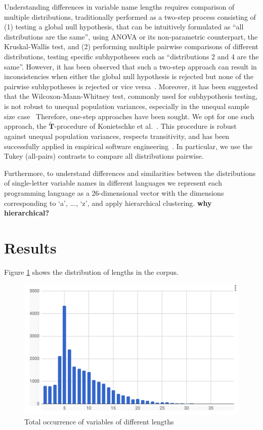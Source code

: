 \documentclass[conference]{IEEEtran}
\newcommand{\todo}[1]{ \textbf{#1} }
\begin{document}
Understanding differences in variable name lengths requires comparison of multiple distributions, traditionally performed as a two-step process consisting of (1) testing a global null hypothesis, that can be intuitively formulated as ``all distributions are the same'', using ANOVA or its non-parametric counterpart, the Kruskal-Wallis test, and (2) performing multiple pairwise comparisons of different distributions, testing specific subhypotheses such as ``distributions 2 and 4 are the same''. 
However, it has been observed that such a two-step approach can result in inconsistencies when either the global null hypothesis is rejected but none of the pairwise subhypotheses is rejected or vice versa~\cite{Gabriel}. 
Moreover, it has been suggested that the Wilcoxon-Mann-Whitney test, commonly used for subhypothesis testing, is not robust to unequal population variances, especially in the unequal sample size case~\cite{Zimmerman:Zumbo}
Therefore, one-step approaches have been sought.
We opt for one such approach, the $\widetilde{\mathbf{T}}$-procedure of Konietschke et al.~\cite{Konietschke:Hothorn:Brunner}. 
This procedure is robust against unequal population variances, respects transitivity, and has been successfully applied in empirical software engineering~\cite{VasilescuSGM14,VasilescuCS14,YuWYW16}.
In particular, we use the Tukey (all-pairs) contrasts to compare all distributions pairwise.

Furthermore, to understand differences and similarities between the distributions of single-letter variable names in different languages we represent each programming language as a 26-dimensional vector with the dimensions corresponding to `a', ..., `z', and apply hierarchical clustering. \todo{why hierarchical?}
 \section{Results}

Figure \ref{fig:distribution_of_lengths} shows the distribution of lengths in the corpus.

\begin{figure}[h]
	\begin{center}
		\includegraphics[width=\columnwidth]{fig/distribution_of_lengths}
		\caption{Total occurrence of variables of different lengths}
		\label{fig:distribution_of_lengths}
	\end{center}
\end{figure} 
\end{document}

